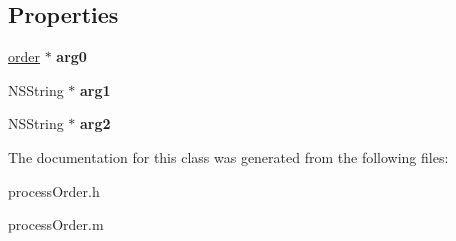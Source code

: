 \subsection*{Properties}
\begin{DoxyCompactItemize}
\item 
\hypertarget{interfaceprocess_order_a35ffd86c3c9fa8e0959f45ada480dfbf}{}\hyperlink{interfaceorder}{order} $\ast$ {\bfseries arg0}\label{interfaceprocess_order_a35ffd86c3c9fa8e0959f45ada480dfbf}

\item 
\hypertarget{interfaceprocess_order_ac14bafe69d5862f91a472fd6883de911}{}N\+S\+String $\ast$ {\bfseries arg1}\label{interfaceprocess_order_ac14bafe69d5862f91a472fd6883de911}

\item 
\hypertarget{interfaceprocess_order_a344e28af740e11da70371cb1cb0fc143}{}N\+S\+String $\ast$ {\bfseries arg2}\label{interfaceprocess_order_a344e28af740e11da70371cb1cb0fc143}

\end{DoxyCompactItemize}


The documentation for this class was generated from the following files\+:\begin{DoxyCompactItemize}
\item 
process\+Order.\+h\item 
process\+Order.\+m\end{DoxyCompactItemize}
